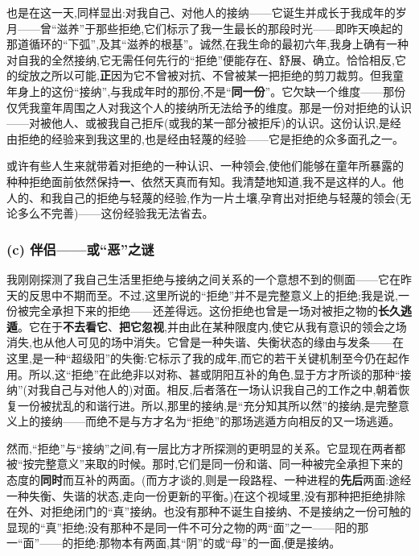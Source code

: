 也是在这一天,同样显出:对我自己、对他人的接纳——它诞生并成长于我成年的岁月——曾“滋养”于那些拒绝,它们标示了我一生最长的那段时光——即昨天唤起的那道循环的“下弧”,及其“滋养的根基”。诚然,在我生命的最初六年,我身上确有一种对自我的全然接纳,它无需任何先行的“拒绝”便能存在、舒展、确立。恰恰相反,它的绽放之所以可能,\textbf{正}因为它不曾被对抗、不曾被某一把拒绝的剪刀裁剪。但我童年身上的这份“接纳”,与我成年时的那份,不是“\textbf{同一份}”。它欠缺一个维度——那份仅凭我童年周围之人对我这个人的接纳所无法给予的维度。那是一份对拒绝的认识——对被他人、或被我自己拒斥(或我的某一部分被拒斥)的认识。这份认识,是经由拒绝的经验来到我这里的,也是经由轻蔑的经验——它是拒绝的众多面孔之一。

或许有些人生来就带着对拒绝的一种认识、一种领会,使他们能够在童年所暴露的种种拒绝面前依然保持\textbf{一}、依然天真而有知。我清楚地知道,我不是这样的人。他人的、和我自己的拒绝与轻蔑的经验,作为一片土壤,孕育出对拒绝与轻蔑的领会(无论多么不完善)——这份经验我无法省去。

\subsubsection*{(c) 伴侣——或“恶”之谜}
\label{ch18:local:h24}

\label{ch18:local:n21}

我刚刚探测了我自己生活里拒绝与接纳之间关系的一个意想不到的侧面——它在昨天的反思中不期而至。不过,这里所说的“拒绝”并不是完整意义上的拒绝;我是说,一份被完全承担下来的拒绝——还差得远。这份拒绝也曾是一场对被拒之物的\textbf{长久逃遁}。它在于\textbf{不去看它}、\textbf{把它忽视},并由此在某种限度内,使它从我有意识的领会之场消失,也\dmark{}从他人可见的场中消失。它曾是一种失谐、失衡状态的缘由与发条——在这里,是一种“超级阳”的失衡:它标示了我的成年,而它的若干关键机制至今仍在起作用。所以,这“拒绝”在此绝非以对称、甚或阴阳互补的角色,显于方才所谈的那种“接纳”(对我自己与对他人的)对面。相反,后者落在一场认识我自己的工作之中,朝着恢复一份被扰乱的和谐行进。所以,那里的接纳,是“充分知其所以然”的接纳,是完整意义上的接纳——而绝不是与方才名为“拒绝”的那场逃遁方向相反的又一场逃遁。

然而,“拒绝”与“接纳”之间,有一层比方才所探测的更明显的关系。它显现在两者都被“按完整意义”来取的时候。那时,它们是同一份和谐、同一种被完全承担下来的态度的\textbf{同时}而互补的两面。(而方才谈的,则是一段路程、一种进程的\textbf{先后}两面:途经一种失衡、失谐的状态,走向一份更新的平衡。)在这个视域里,没有那种把拒绝排除在外、对拒绝闭门的“真”接纳。也没有那种不诞生自接纳、不是接纳之一份可触的显现的“真”拒绝;没有那种不是同一件不可分之物的两“面”之一——阳的那一“面”——的拒绝:那物本有两面,其“阴”的或“母”的一面,便是接纳。

